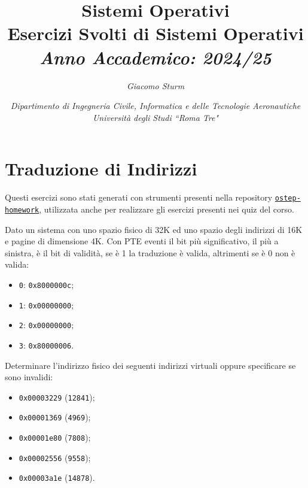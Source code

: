 \documentclass{article}
\numberwithin{equation}{subsection}
\begin{document}
\title{%
    \textbf{Sistemi Operativi}  \\ 
    \large Esercizi Svolti di Sistemi Operativi \\
    \textit{Anno Accademico: 2024/25}}
\author{\textit{Giacomo Sturm}}
\date{\textit{Dipartimento di Ingegneria Civile, Informatica e delle Tecnologie Aeronautiche \\
Università degli Studi ``Roma Tre"}}

\maketitle
\thispagestyle{link}

\clearpage


\pagestyle{fancy}
\fancyhead{}\fancyfoot{}
\fancyfoot[C]{\thepage}

\tableofcontents

\clearpage
{}

\section{Traduzione di Indirizzi}
Questi esercizi sono stati generati con strumenti presenti nella repository \href{https://github.com/remzi-arpacidusseau/ostep-homework}{\texttt{ostep-homework}}, utilizzata anche per 
realizzare gli esercizi presenti nei quiz del corso. 


Dato un sistema con uno spazio fisico di 32K ed uno spazio degli indirizzi di 16K e pagine di dimensione 4K. Con PTE eventi il bit più significativo, il più a sinistra, 
è il bit di validità, se è 1 la traduzione è valida, altrimenti se è 0 non è valida:
\begin{itemize}
    \item \verb|0|: \verb|0x8000000c|;
    \item \verb|1|: \verb|0x00000000|;
    \item \verb|2|: \verb|0x00000000|;
    \item \verb|3|: \verb|0x80000006|.
\end{itemize}

Determinare l'indirizzo fisico dei seguenti indirizzi virtuali oppure specificare se sono invalidi:
\begin{itemize}
    \item \verb|0x00003229| (\verb|12841|);
    \item \verb|0x00001369| (\verb|4969|);
    \item \verb|0x00001e80| (\verb|7808|);
    \item \verb|0x00002556| (\verb|9558|);
    \item \verb|0x00003a1e| (\verb|14878|).
\end{itemize}
\end{document}
